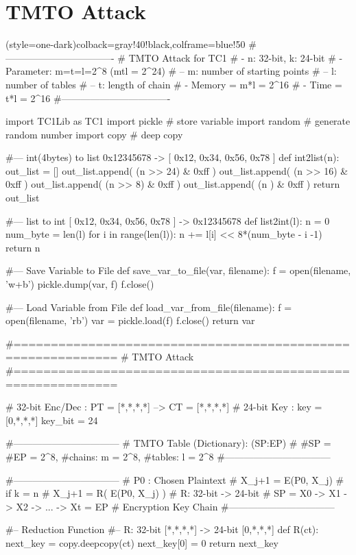 \section{TMTO Attack}
\begin{python}(style=one-dark){colback=gray!40!black,colframe=blue!50}
#----------------------------------
# TMTO Attack for TC1
# - n: 32-bit, k: 24-bit
# - Parameter: m=t=l=2^8 (mtl = 2^24)
# -- m: number of starting points
# -- l: number of tables
# -- t: length of chain
# - Memory = m*l = 2^16
# - Time   = t*l = 2^16
#----------------------------------

import TC1Lib as TC1
import pickle # store variable
import random # generate random number
import copy   # deep copy 

#--- int(4bytes) to list 0x12345678 -> [ 0x12, 0x34, 0x56, 0x78 ]
def int2list(n):
   out_list = []
   out_list.append( (n >> 24) & 0xff )
   out_list.append( (n >> 16) & 0xff )
   out_list.append( (n >>  8) & 0xff )
   out_list.append( (n      ) & 0xff )
   return out_list

#--- list to int [ 0x12, 0x34, 0x56, 0x78 ] -> 0x12345678
def list2int(l):
   n = 0
   num_byte = len(l)
   for i in range(len(l)):
      n += l[i] << 8*(num_byte - i -1)
   return n

#--- Save Variable to File
def save_var_to_file(var, filename):
   f = open(filename, 'w+b')
   pickle.dump(var, f)
   f.close()

#--- Load Variable from File
def load_var_from_file(filename):
   f = open(filename, 'rb')
   var = pickle.load(f)
   f.close()
   return var

#============================================================
#  TMTO Attack
#============================================================

# 32-bit Enc/Dec : PT = [*,*,*,*] --> CT = [*,*,*,*]
# 24-bit Key     : key = [0,*,*,*]
key_bit = 24

#---------------------------------
# TMTO Table (Dictionary): { (SP:EP) }
#   #SP = #EP = 2^8,   #chains: m = 2^8, #tables: l = 2^8
#---------------------------------

#---------------------------------
# P0 : Chosen Plaintext
# X_{j+1} = E(P0, X_{j}) 		# if k = n
# X_{j+1} = R( E(P0, X_{j}) ) 	   # R: 32-bit -> 24-bit
# SP = X0 -> X1 -> X2 -> ... -> Xt = EP  # Encryption Key Chain
#---------------------------------

#-- Reduction Function
#-- R: 32-bit [*,*,*,*] -> 24-bit [0,*,*,*]
def R(ct):
   next_key = copy.deepcopy(ct)
   next_key[0] = 0
   return next_key


\end{python}
